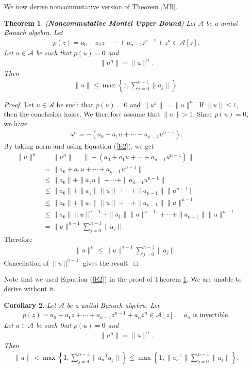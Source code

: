 \documentclass{amsart}
\newtheorem{theorem}{Theorem}[section]
\newtheorem{corollary}[theorem] {Corollary}
\begin{document}
We now derive noncommutative version of Theorem \ref{MB}.
\begin{theorem} \label{NMB1}
	(\textbf{Noncommutative Montel Upper Bound}) Let $\mathcal{A}$ be a unital Banach algebra. Let 
	\begin{align*}
		p(z)=a_0+a_1z+\cdots+a_{n-1}z^{n-1}+z^n\in \mathcal{A}[z].
	\end{align*}
	Let $u \in \mathcal{A}$ be such that $p(u)=0$ and 
	\begin{align}\label{E2}
		\|u^n\|=\|u\|^n.
	\end{align}
	Then 
	\begin{align*}
		\|u\|\leq \max\left\{1, \sum_{j=0}^{n-1}\|a_j\|\right\}.
	\end{align*}
\end{theorem}
\begin{proof}
	Let $u \in \mathcal{A}$ be such that $p(u)=0$ and $\|u^n\|=\|u\|^n$. If $\|u\|\leq 1$, then the conclusion holds. We therefore assume that $\|u\|>1$. 
	Since $p(u)=0$, we have 
\begin{align*}
	u^n=-(a_0+a_1u+\cdots+a_{n-1}u^{n-1}).
\end{align*}
By taking norm and using Equation (\ref{E2}), we get 
\begin{align*}
	\|u\|^n&=\|u^n\|=\|-(a_0+a_1u+\cdots+a_{n-1}u^{n-1})\|\\
	&=\|a_0+a_1u+\cdots+a_{n-1}u^{n-1}\|\\
	&\leq \|a_0\|+\|a_1u\|+\cdots+\|a_{n-1}u^{n-1}\|\\
	&\leq \|a_0\|+\|a_1\|\|u\|+\cdots+\|a_{n-1}\|\|u^{n-1}\|\\
	&\leq \|a_0\|+\|a_1\|\|u\|+\cdots+\|a_{n-1}\|\|u\|^{n-1}\\
		&\leq \|a_0\|\|u\|^{n-1}+\|a_1\|\|u\|^{n-1}+\cdots+\|a_{n-1}\|\|u\|^{n-1}\\
	&=\|u\|^{n-1}\sum_{j=0}^{n-1}\|a_j\|.
\end{align*}
Therefore 	
\begin{align*}
	\|u\|^n\leq \|u\|^{n-1}\sum_{j=0}^{n-1}\|a_j\|.
\end{align*}
Cancellation of $\|u\|^{n-1}$ gives the result.
\end{proof}
Note that we used Equation (\ref{E2}) in the proof of Theorem \ref{NMB1}. We are unable to derive without it. 
\begin{corollary}
Let $\mathcal{A}$ be a unital Banach algebra. Let 
\begin{align*}
	p(z)=a_0+a_1z+\cdots+a_{n-1}z^{n-1}+a_nz^n\in \mathcal{A}[z], \quad a_n \text{ is invertible}.
\end{align*}
Let $u \in \mathcal{A}$ be such that $p(u)=0$ and 
\begin{align*}
	\|u^n\|=\|u\|^n.
\end{align*}
Then 
\begin{align*}
	\|u\|< \max\left\{1, \sum_{j=0}^{n-1}\|a_n^{-1}a_j\|\right\}\leq \max\left\{1,\|a_n^{-1}\| \sum_{j=0}^{n-1}\|a_j\|\right\}.
\end{align*}	
\end{corollary}
\end{document}
